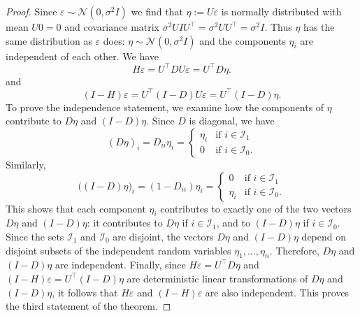\documentclass[
  a4paper,
]{article}
\theoremstyle{definition}
\theoremstyle{definition}
\theoremstyle{definition}
\theoremstyle{definition}
\theoremstyle{remark}
\begin{document}
\begin{proof}
Since \(\varepsilon\sim \mathcal{N}(0, \sigma^2 I)\) we find that \(\eta := U \varepsilon\) is normally
distributed with mean \(U 0 = 0\) and covariance matrix \(\sigma^2 U I U^\top =
\sigma^2 U U^\top = \sigma^2 I\). Thus \(\eta\) has the same distribution as
\(\varepsilon\) does: \(\eta \sim \mathcal{N}(0, \sigma^2I)\) and the components \(\eta_i\)
are independent of each other. We have
\begin{equation*}
  H \varepsilon
  = U^\top D U \varepsilon
  = U^\top D \eta.
\end{equation*}
and
\begin{equation*}
  (I - H) \varepsilon
  = U^\top (I - D) U \varepsilon
  = U^\top (I - D) \eta.
\end{equation*}
To prove the independence statement, we examine how the components of \(\eta\)
contribute to \(D\eta\) and \((I-D)\eta\). Since \(D\) is diagonal, we have
\begin{equation*}
  (D\eta)_i
  = D_{ii} \eta_i
  = \begin{cases}
      \eta_i & \text{if } i \in \mathcal{I}_1 \\
      0      & \text{if } i \in \mathcal{I}_0.
    \end{cases}
\end{equation*}
Similarly,
\begin{equation*}
  \bigl((I - D)\eta\bigr)_i
  = (1 - D_{ii}) \eta_i
  = \begin{cases}
      0      & \text{if } i \in \mathcal{I}_1 \\
      \eta_i & \text{if } i \in \mathcal{I}_0.
    \end{cases}
\end{equation*}
This shows that each component \(\eta_i\) contributes to exactly one of the
two vectors \(D\eta\) and \((I-D)\eta\): it contributes to \(D\eta\) if \(i \in \mathcal{I}_1\),
and to \((I-D)\eta\) if \(i \in \mathcal{I}_0\).
Since the sets \(\mathcal{I}_1\) and \(\mathcal{I}_0\) are disjoint, the vectors
\(D\eta\) and \((I-D)\eta\) depend on disjoint subsets of the independent random
variables \(\eta_1, \ldots, \eta_n\). Therefore, \(D\eta\) and \((I-D)\eta\)
are independent.
Finally, since \(H\varepsilon= U^\top D\eta\) and \((I-H)\varepsilon= U^\top(I-D)\eta\)
are deterministic linear transformations of \(D\eta\) and \((I-D)\eta\), it
follows that \(H\varepsilon\) and \((I - H)\varepsilon\) are also independent.
This proves the third statement of the theorem.


\end{proof}
\end{document}
